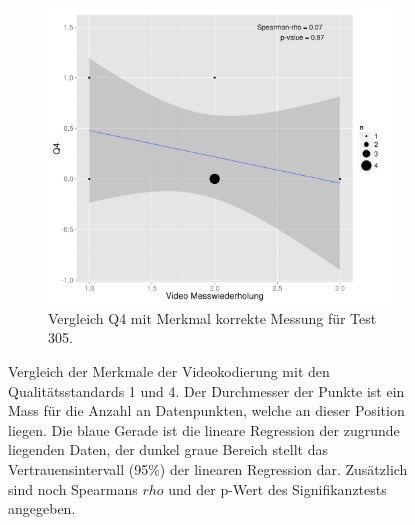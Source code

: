 \begin{figure}[htp]
\begin{subfigure}{0.32\textwidth}
       \label{fig:corVideoQ4301}
     \end{subfigure}
      \begin{subfigure}{0.32\textwidth}
         \includegraphics[width=1.0\linewidth]{graphics/corVideoQ4305.png}
       \caption{Vergleich Q4 mit Merkmal korrekte Messung für Test 305.}
       \label{fig:corVideoQ4305}
       \end{subfigure}
  
  \caption{Vergleich der Merkmale der Videokodierung mit den Qualitätsstandards 1 und 4. Der Durchmesser der Punkte ist ein Mass für die Anzahl an Datenpunkten, welche an dieser Position liegen. Die blaue Gerade ist die lineare Regression der zugrunde liegenden Daten, der dunkel graue Bereich stellt das Vertrauensintervall (95\%) der linearen Regression dar. Zusätzlich sind noch Spearmans $rho$ und der p-Wert des Signifikanztests angegeben.}
  \label{fig:corVideoQ}
  \end{figure}
 
